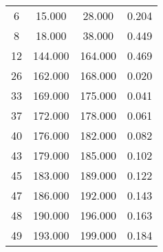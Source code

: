 % 
\begin{tabular}{cccc}
  \hline
  \hline
6 & 15.000 & 28.000 & 0.204 \\ 
  8 & 18.000 & 38.000 & 0.449 \\ 
  12 & 144.000 & 164.000 & 0.469 \\ 
  26 & 162.000 & 168.000 & 0.020 \\ 
  33 & 169.000 & 175.000 & 0.041 \\ 
  37 & 172.000 & 178.000 & 0.061 \\ 
  40 & 176.000 & 182.000 & 0.082 \\ 
  43 & 179.000 & 185.000 & 0.102 \\ 
  45 & 183.000 & 189.000 & 0.122 \\ 
  47 & 186.000 & 192.000 & 0.143 \\ 
  48 & 190.000 & 196.000 & 0.163 \\ 
  49 & 193.000 & 199.000 & 0.184 \\ 
   \hline
\end{tabular}
